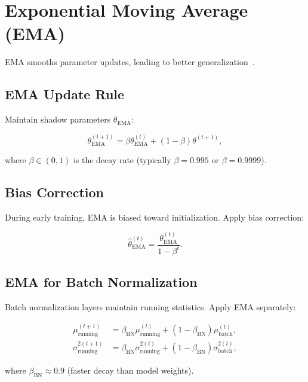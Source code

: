 \documentclass[12pt]{report}
\theoremstyle{definition}
\begin{document}
\section{Exponential Moving Average (EMA)}

EMA smooths parameter updates, leading to better generalization~\citep{polyak1992acceleration}.

\subsection{EMA Update Rule}

Maintain shadow parameters $\theta_{\text{EMA}}$:

\begin{equation}
\theta_{\text{EMA}}^{(t+1)} = \beta \theta_{\text{EMA}}^{(t)} + (1 - \beta) \theta^{(t+1)},
\label{eq:ema_update}
\end{equation}

where $\beta \in (0, 1)$ is the decay rate (typically $\beta = 0.995$ or $\beta = 0.9999$).

\subsection{Bias Correction}

During early training, EMA is biased toward initialization. Apply bias correction:

\begin{equation}
\hat{\theta}_{\text{EMA}}^{(t)} = \frac{\theta_{\text{EMA}}^{(t)}}{1 - \beta^t}.
\label{eq:ema_bias_correction}
\end{equation}

\subsection{EMA for Batch Normalization}

Batch normalization layers maintain running statistics. Apply EMA separately:

\begin{align}
\mu_{\text{running}}^{(t+1)} &= \beta_{\text{BN}} \mu_{\text{running}}^{(t)} + (1 - \beta_{\text{BN}}) \mu_{\text{batch}}^{(t)}, \label{eq:bn_mean_ema} \\
\sigma_{\text{running}}^{2(t+1)} &= \beta_{\text{BN}} \sigma_{\text{running}}^{2(t)} + (1 - \beta_{\text{BN}}) \sigma_{\text{batch}}^{2(t)}, \label{eq:bn_var_ema}
\end{align}

where $\beta_{\text{BN}} \approx 0.9$ (faster decay than model weights).
\end{document}
